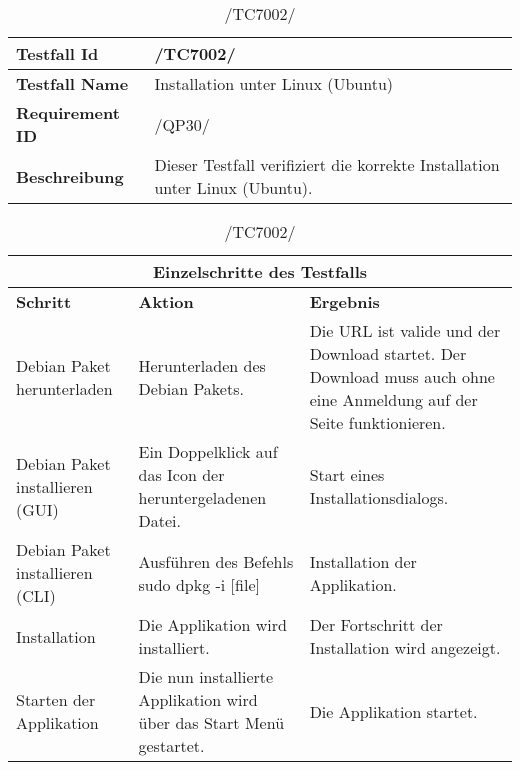 \begin{table}[h]
\caption{/TC7002/}
\label{tab:TC7002}
\begin{center}
\begin{tabular}{|p{3.5cm}|p{12cm}|}
\hline
\textbf{Testfall Id} & /TC7002/\\
\hline
\textbf{Testfall Name} & Installation unter Linux (Ubuntu)\\
\hline
\textbf{Requirement ID} & /QP30/\\
\hline
\textbf{Beschreibung} & Dieser Testfall verifiziert die korrekte Installation unter Linux (Ubuntu).\\
\hline
\end{tabular}
\begin{tabular}{|p{2.5cm}|p{5cm}|p{7.55cm}|}
\multicolumn{3}{|c|}{\textbf{Einzelschritte des Testfalls}} \\
\hline
\textbf{Schritt} & \textbf{Aktion} & \textbf{Ergebnis}\\
\hline
Debian Paket herunterladen & Herunterladen des Debian Pakets. & Die URL ist valide und der Download startet. Der Download muss auch ohne eine Anmeldung auf der Seite funktionieren.\\
\hline
Debian Paket installieren (GUI) & Ein Doppelklick auf das Icon der heruntergeladenen Datei. & Start eines Installationsdialogs. \\
\hline
Debian Paket installieren (CLI) & Ausführen des Befehls sudo dpkg -i [file] & Installation der Applikation.\\
\hline
Installation & Die Applikation wird installiert. & Der Fortschritt der Installation wird angezeigt. \\
\hline
Starten der Applikation & Die nun installierte Applikation wird über das Start Menü gestartet. & Die Applikation startet. \\
\hline
\end{tabular}
\end{center}
\label{default}
\end{table}
